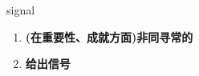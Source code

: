
\begin{frame}
{\huge signal}
\begin{center}
\begin{enumerate}\Large
  \item \textbf{(在重要性、成就方面)非同寻常的}
  \item \textbf{给出信号}
\end{enumerate}
\end{center}
\end{frame}
